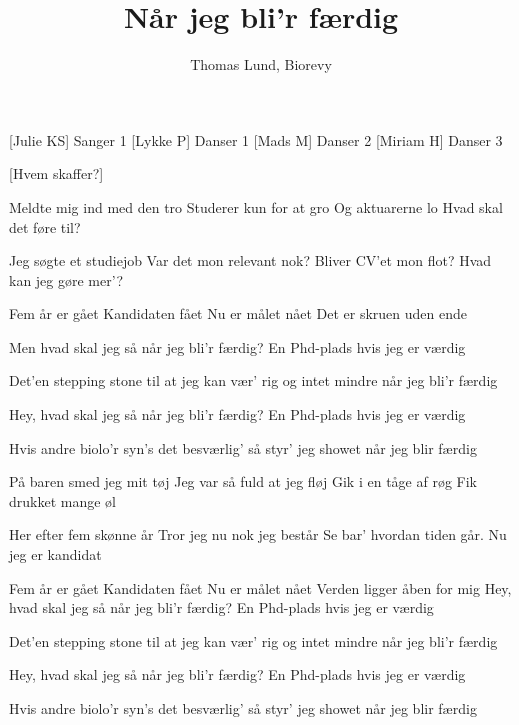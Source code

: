 \documentclass[a4paper,12pt]{article}
\title{Når jeg bli'r færdig}
\author{Thomas Lund, Biorevy}
\begin{document}
\maketitle

\begin{texxers}
\end{texxers}

\begin{roles}
	[Julie KS] Sanger 1
	[Lykke P] Danser 1
	[Mads M] Danser 2
	[Miriam H] Danser 3
\end{roles}


\begin{props}
	[Hvem skaffer?] 
\end{props}

\begin{song}


Meldte mig ind med den tro
Studerer kun for at gro
Og aktuarerne lo
Hvad skal det føre til?

Jeg søgte et studiejob
Var det mon relevant nok?
Bliver CV'et mon flot?
Hvad kan jeg gøre mer'? 

Fem år er gået
Kandidaten fået
Nu er målet nået
Det er skruen uden ende

Men hvad skal jeg så
når jeg bli'r færdig?
En Phd-plads
hvis jeg er værdig

Det'en stepping stone til
at jeg kan vær' rig
og intet mindre
når jeg bli'r færdig

Hey, hvad skal jeg så
når jeg bli'r færdig?
En Phd-plads
hvis jeg er værdig

Hvis andre biolo'r
syn's det besværlig'
så styr' jeg showet
når jeg blir færdig

På baren smed jeg mit tøj
Jeg var så fuld at jeg fløj
Gik i en tåge af røg
Fik drukket mange øl

Her efter fem skønne år
Tror jeg nu nok jeg består
Se bar' hvordan tiden går.
Nu jeg er kandidat

Fem år er gået
Kandidaten fået
Nu er målet nået
Verden ligger åben for mig 
Hey, hvad skal jeg så
når jeg bli'r færdig?
En Phd-plads
hvis jeg er værdig

Det'en stepping stone til
at jeg kan vær' rig
og intet mindre
når jeg bli'r færdig

Hey, hvad skal jeg så
når jeg bli'r færdig?
En Phd-plads
hvis jeg er værdig

Hvis andre biolo'r
syn's det besværlig'
så styr' jeg showet
når jeg blir færdig


\end{song}
\end{document}
